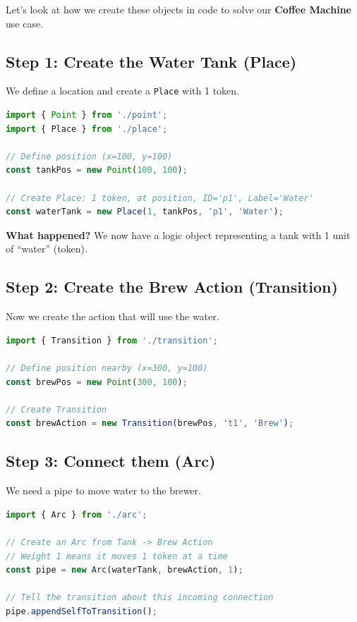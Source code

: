 \documentclass[a4paper,11pt,oneside]{report}
\begin{document}
Let's look at how we create these objects in code to solve our \textbf{Coffee Machine} use case.

\subsection{Step 1: Create the Water Tank (Place)}

We define a location and create a \texttt{Place} with 1 token.

\begin{lstlisting}[language=TypeScript]
import { Point } from './point';
import { Place } from './place';

// Define position (x=100, y=100)
const tankPos = new Point(100, 100);

// Create Place: 1 token, at position, ID='p1', Label='Water'
const waterTank = new Place(1, tankPos, 'p1', 'Water');
\end{lstlisting}

\textbf{What happened?} We now have a logic object representing a tank with 1 unit of ``water'' (token).

\subsection{Step 2: Create the Brew Action (Transition)}

Now we create the action that will use the water.

\begin{lstlisting}[language=TypeScript]
import { Transition } from './transition';

// Define position nearby (x=300, y=100)
const brewPos = new Point(300, 100);

// Create Transition
const brewAction = new Transition(brewPos, 't1', 'Brew');
\end{lstlisting}

\subsection{Step 3: Connect them (Arc)}

We need a pipe to move water to the brewer.

\begin{lstlisting}[language=TypeScript]
import { Arc } from './arc';

// Create an Arc from Tank -> Brew Action
// Weight 1 means it moves 1 token at a time
const pipe = new Arc(waterTank, brewAction, 1);

// Tell the transition about this incoming connection
pipe.appendSelfToTransition();
\end{lstlisting}
\end{document}
